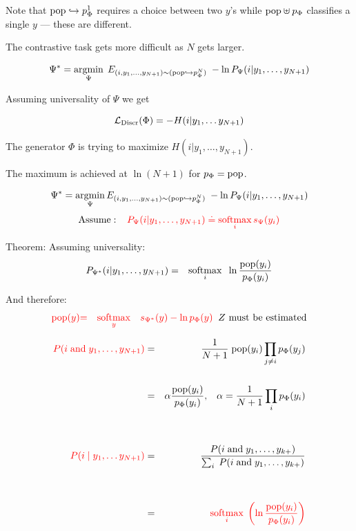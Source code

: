 {\vfill
Note that $\mathrm{pop}\hookrightarrow p_\Phi^1$ requires a choice between two $y$'s while $\mathrm{pop}\uplus p_\Phi$ classifies a single $y$ --- these are different.

\vfill
The contrastive task gets more difficult as $N$ gets larger.


{\color{red} $$\Psi^* = \operatorname*{argmin}_\Psi\; E_{(i,y_1,\ldots,y_{N+1})\sim (\mathrm{pop}\hookrightarrow p_\Phi^N)} \;- \ln P_\Psi(i|y_1,\ldots,y_{N+1})$$}

Assuming universality of $\Psi$ we get

{\color{red} $${\cal L}_{\mathrm{Discr}}(\Phi) = -H(i|y_1,\ldots y_{N+1})$$}

\vfill
The generator $\Phi$ is trying to maximize $H(i|y_1,\ldots,y_{N+1})$.

\vfill
The maximum is achieved at $\ln (N+1)$ for $p_\Phi = \mathrm{pop}$.



$$\Psi^* = \operatorname*{argmin}_\Psi E_{(i,y_1,\ldots,y_{N+1}) \sim (\mathrm{pop}\hookrightarrow p_\Phi^N)} \;- \ln P_\Psi(i|y_1,\ldots,y_{N+1})$$
$$\mathrm{Assume:}\;\;\;\;{\color{red}P_\Psi(i|y_1,\ldots,y_{N+1}) \doteq \operatorname*{softmax}_i s_\Psi(y_i)}$$

\vfill
{\color{red} Theorem}: Assuming universality:
\begin{eqnarray*}
P_{\Psi^*}(i|y_1,\ldots,y_{N+1}) & = & \operatorname*{softmax}_i\;\; \ln \frac{\mathrm{pop}(y_i)}{p_\Phi(y_i)}
\end{eqnarray*}

And therefore:
\begin{eqnarray*}
{\color{red} \mathrm{pop}(y)} & {\color{red} =} & {\color{red} \operatorname*{softmax}_y\;\;\; s_{\Psi^*}(y) - \ln p_\Phi(y)}\;\;\mbox{$Z$ must be estimated}
\end{eqnarray*}

{\huge
\begin{eqnarray*}
{\color{red} P(i \;\mathrm{and}\;y_1,\ldots,y_{N+1})} & = & \frac{1}{N+1}\;\mathrm{pop}(y_i)\prod_{j \not = i}p_\Phi(y_j) \\
\\
& = & \alpha \frac{\mathrm{pop}(y_i)}{p_\Phi(y_i)},\;\;\;\alpha = \frac{1}{N+1} \prod_i p_\Phi(y_i) \\
\\
\\
{\color{red} P(i\;|\;y_1,\ldots y_{N+1})} & = & \frac{P(i\;\mbox{and} \; y_1,\ldots,y_{k+})}{\sum_i \;P(i \;\mbox{and}\; y_1,\ldots,y_{k+})} \\
\\
\\
& = & {\color{red} \operatorname*{softmax}_i\; \left(\ln \frac{\mathrm{pop}(y_i)}{p_\Phi(y_i)}\right)}
\end{eqnarray*}
}


}
